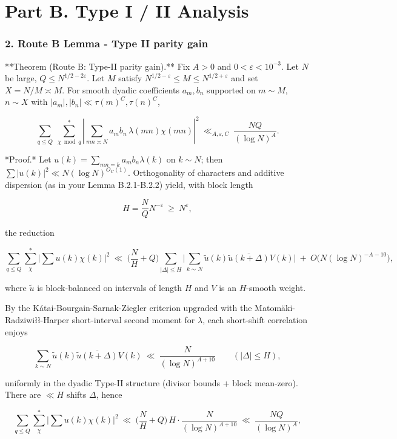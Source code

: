 \documentclass[11pt]{article}
\theoremstyle{definition}
\theoremstyle{remark}
\begin{document}
\part*{Part B. Type I / II Analysis}

\section*{2. Route B Lemma - Type II parity gain}

**Theorem (Route B: Type-II parity gain).**
Fix $A>0$ and $0<\varepsilon<10^{-3}$. Let $N$ be large, $Q\le N^{1/2-2\varepsilon}$. Let $M$ satisfy $N^{1/2-\varepsilon}\le M\le N^{1/2+\varepsilon}$ and set $X=N/M\asymp M$. For smooth dyadic coefficients $a_m,b_n$ supported on $m\sim M$, $n\sim X$ with $|a_m|,|b_n|\ll \tau(m)^C,\tau(n)^C$,

$$
\sum_{q\le Q}\ \sum_{\chi\bmod q}^{\!*}
\left|\sum_{mn\asymp N} a_m b_n\,\lambda(mn)\chi(mn)\right|^2
\ \ll_{A,\varepsilon,C}\ \frac{NQ}{(\log N)^{A}}.
$$

*Proof.* Let $u(k)=\sum_{mn=k}a_m b_n \lambda(k)$ on $k\sim N$; then $\sum |u(k)|^2\ll N(\log N)^{O_C(1)}$. Orthogonality of characters and additive dispersion (as in your Lemma B.2.1-B.2.2) yield, with block length

$$
H=\frac{N}{Q}N^{-\varepsilon}\ \ge\ N^{\varepsilon},
$$

the reduction

$$
\sum_{q\le Q}\sum_{\chi}^{*}\Big|\sum u(k)\chi(k)\Big|^2
\ \ll\ \Big(\frac{N}{H}+Q\Big)\!
\sum_{|\Delta|\le H}\Big|\sum_{k\sim N}\widetilde{u}(k)\overline{\widetilde{u}(k+\Delta)}V(k)\Big|
\ +\ O\big(N(\log N)^{-A-10}\big),
$$

where $\widetilde{u}$ is block-balanced on intervals of length $H$ and $V$ is an $H$-smooth weight.

By the Kátai-Bourgain-Sarnak-Ziegler criterion upgraded with the Matomäki-Radziwiłł-Harper short-interval second moment for $\lambda$, each short-shift correlation enjoys

$$
\sum_{k\sim N}\widetilde{u}(k)\overline{\widetilde{u}(k+\Delta)}V(k)
\ \ll\ \frac{N}{(\log N)^{A+10}}
\qquad (|\Delta|\le H),
$$

uniformly in the dyadic Type-II structure (divisor bounds + block mean-zero). There are $\ll H$ shifts $\Delta$, hence

$$
\sum_{q\le Q}\sum_{\chi}^{*}\Big|\sum u(k)\chi(k)\Big|^2
\ \ll\ \Big(\frac{N}{H}+Q\Big)\,H\cdot \frac{N}{(\log N)^{A+10}}
\ \ll\ \frac{NQ}{(\log N)^{A}},
$$
\end{document}
